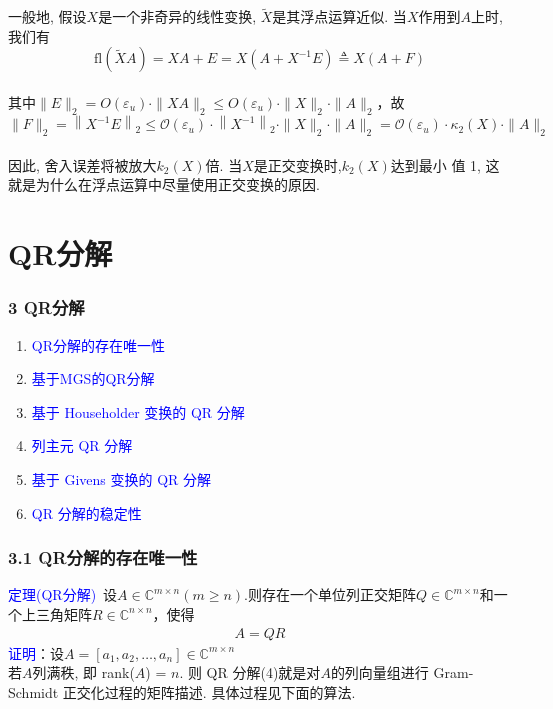 \documentclass[notheorems,serif]{beamer}
\begin{document}
\begin{frame}
一般地, 假设$X$是一个非奇异的线性变换, $\tilde{X}$是其浮点运算近似. 当$X$作用到$A$上时, 我们有$$
\mathrm{fl}(\tilde{X} A)=X A+E=X\left(A+X^{-1} E\right) \triangleq X(A+F)
$$\\
其中$\|E\|_{2}=O\left(\varepsilon_{u}\right) \cdot\|X A\|_{2} \leq O\left(\varepsilon_{u}\right) \cdot\|X\|_{2} \cdot\|A\|_{2}$，故$$
\|F\|_{2}=\left\|X^{-1} E\right\|_{2} \leq \mathcal{O}\left(\varepsilon_{u}\right) \cdot\left\|X^{-1}\right\|_{2} \cdot\|X\|_{2} \cdot\|A\|_{2}=\mathcal{O}\left(\varepsilon_{u}\right) \cdot \kappa_{2}(X) \cdot\|A\|_{2}
$$\\
因此, 舍入误差将被放大$k_2(X)$倍. 当$X$是正交变换时,$k_2(X)$达到最小
值 1, 这就是为什么在浮点运算中尽量使用正交变换的原因.
\end{frame}
\section{QR分解}
\begin{frame}
\frametitle{3 QR分解}
\begin{enumerate}[3.1]
	\item \textcolor{blue}{QR分解的存在唯一性}
	\item \textcolor{blue}{基于MGS的QR分解}
	\item \textcolor{blue}{基于 Householder 变换的 QR 分解}
	\item \textcolor{blue}{列主元 QR 分解}
	\item \textcolor{blue}{基于 Givens 变换的 QR 分解}
	\item \textcolor{blue}{QR 分解的稳定性}
\end{enumerate}
\end{frame}

\begin{frame}
\frametitle{3.1 QR分解的存在唯一性}
\textcolor{blue}{定理(QR分解)}~设$A \in \mathbb{C}^{m \times n}(m \geq n)$.则存在一个单位列正交矩阵$Q \in \mathbb{C}^{m \times n}$和一个上三角矩阵$R \in \mathbb{C}^{n \times n}$，使得
\begin{eqnarray}
A=QR
\end{eqnarray}
\textcolor{blue}{证明}：设$A=\left[a_{1}, a_{2}, \ldots, a_{n}\right] \in \mathbb{C}^{m \times n}$\\
若$A$列满秩, 即 rank($A$) = $n$. 则 QR 分解(4)就是对$A$的列向量组进行
Gram-Schmidt 正交化过程的矩阵描述. 具体过程见下面的算法.
\end{frame}
\end{document}
